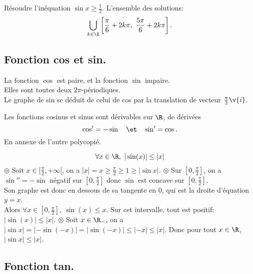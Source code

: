 \documentclass[11pt]{article}
\begin{document}
\begin{ex}{}{}
    Résoudre l'inéquation $\sin x\geq\frac{1}{2}$.
    \tcblower
    L'ensemble des solutions:
    \begin{equation*}
        \bigcup_{k\in\Z}\left[\frac{\pi}{6}+2k\pi,~\frac{5\pi}{6}+2k\pi\right].
    \end{equation*}
\end{ex}

\subsection{Fonction cos et sin.}

\begin{corr}{}{}
    La fonction $\cos$ est paire, et la fonction $\sin$ impaire.\\
    Elles sont toutes deux $2\pi$-périodiques.\\
    Le graphe de sin se déduit de celui de cos par la translation de vecteur $\frac{\pi}{2}\v{i}$.
\end{corr}

\begin{prop}{}{}
    Les fonctions cosinus et sinus sont dérivables sur $\R$, de dérivées
    \begin{equation*}
        \cos'=-\sin\quad\et\quad\sin'=\cos.
    \end{equation*}
    \tcblower
    En annexe de l'autre polycopié.
\end{prop}

\begin{prop}{}{}
    \begin{equation*}
        \forall x \in \R,~|\sin(x)|\leq|x|
    \end{equation*}
    \tcblower
    $\circledcirc$ Soit $x\in[\frac{\pi}{2},+\infty[$, on a $|x|=x\geq\frac{\pi}{2}\geq1\geq|\sin x|$.\n
    $\circledcirc$ Sur $[0,\frac{\pi}{2}]$, on a $\sin''=-\sin$ négatif sur $[0,\frac{\pi}{2}]$ donc $\sin$ est concave sur $[0,\frac{\pi}{2}]$.\\
    Son graphe est donc en dessous de sa tangente en 0, qui est la droite d'équation $y=x$.\\
    Alors $\forall x \in [0,\frac{\pi}{2}],~\sin(x)\leq x$. Sur cet intervalle, tout est positif: $|\sin(x)|\leq|x|$.\n
    $\circledcirc$ Soit $x\in\R_-$, on a $|\sin x|=|-\sin(-x)|=|\sin(-x)|\leq|-x|\leq|x|$.\n
    Donc pour tout $x\in\R$, $|\sin x|\leq |x|$.
\end{prop}

\subsection{Fonction tan.}
\end{document}
